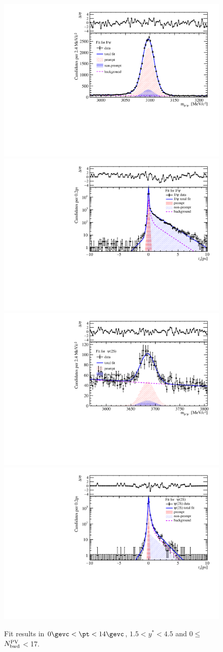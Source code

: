 \begin{figure}[H]
\begin{center}
\includegraphics[width=0.45\linewidth]{pdf/pPb/BWorkdir/TwoDimFit/ProjMass/Jpsi_n1y1pt1.pdf}
\includegraphics[width=0.45\linewidth]{pdf/pPb/BWorkdir/TwoDimFit/ProjTz/Jpsi_n1y1pt1.pdf}
\vspace*{-0.5cm}
\includegraphics[width=0.45\linewidth]{pdf/pPb/BWorkdir/TwoDimFit/ProjMass/Psi2S_n1y1pt1.pdf}
\includegraphics[width=0.45\linewidth]{pdf/pPb/BWorkdir/TwoDimFit/ProjTz/Psi2S_n1y1pt1.pdf}
\vspace*{-0.5cm}
\end{center}
\caption{Fit results in $0\gevc<\pt<14\gevc$, $1.5<y^*<4.5$ and 0$\leq$$N_{\rm bwd}^{\rm PV}$$<$17.}
\end{figure}
